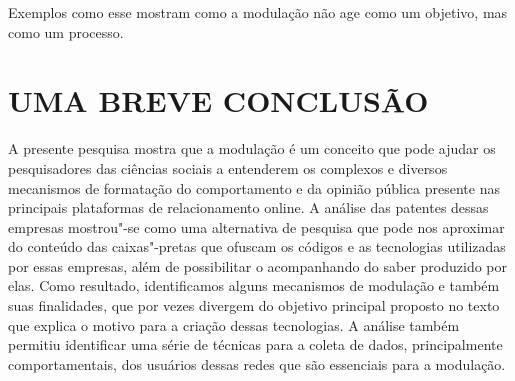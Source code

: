 Exemplos como esse mostram como a modulação não age como um objetivo,
mas como um processo.

\section{UMA BREVE CONCLUSÃO}

A presente pesquisa mostra que a modulação é um conceito que pode ajudar
os pesquisadores das ciências sociais a entenderem os complexos e
diversos mecanismos de formatação do comportamento e da opinião pública
presente nas principais plataformas de relacionamento online. A análise
das patentes dessas empresas mostrou"-se como uma alternativa de pesquisa
que pode nos aproximar do conteúdo das caixas"-pretas que ofuscam os
códigos e as tecnologias utilizadas por essas empresas, além de
possibilitar o acompanhando do saber produzido por elas. Como resultado,
identificamos alguns mecanismos de modulação e também suas finalidades,
que por vezes divergem do objetivo principal proposto no texto que
explica o motivo para a criação dessas tecnologias. A análise também
permitiu identificar uma série de técnicas para a coleta de dados,
principalmente comportamentais, dos usuários dessas redes que são
essenciais para a modulação.

